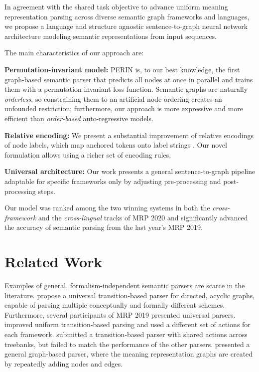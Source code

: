\documentclass[11pt,a4paper]{article}
\newenvironment{citemize}{\begin{list}{}{\topsep=\smallskipamount\itemsep=1pt\parsep=1pt\labelwidth=.5em}}{\end{list}}
\begin{document}
In agreement with the shared task objective to advance uniform meaning representation parsing across diverse semantic graph frameworks and languages, we propose a language and structure agnostic sentence-to-graph neural network architecture modeling semantic representations from input sequences.

The main characteristics of our approach are:

\begin{citemize}
  \item \textbf{Permutation-invariant model:} PERIN is, to our best
  knowledge, the first graph-based semantic parser that predicts all nodes at once in parallel and trains them with a permutation-invariant loss function. Semantic graphs are naturally \emph{orderless}, so constraining them to an artificial node ordering creates an unfounded restriction; furthermore, our approach is more expressive and more efficient than \emph{order-based} auto-regressive models.
  \item \textbf{Relative encoding:} We present a substantial improvement of relative encodings of node labels, which map anchored tokens onto label strings \cite{Str:Str:19}. Our novel formulation allows using a richer set of encoding rules.
  \item \textbf{Universal architecture:} Our work presents a general sentence-to-graph pipeline adaptable for specific frameworks only by adjusting pre-processing and post-processing steps.
\end{citemize}

\noindent
Our model was ranked among the two winning systems in both the \emph{cross-framework} and the \emph{cross-lingual} tracks of MRP 2020 and significantly advanced the accuracy of semantic parsing from the last year's MRP 2019.
 \section{Related Work}

Examples of general, formalism-independent semantic parsers are scarce in the literature. \citet{hershcovich2018multitask} propose a universal transition-based parser for directed, acyclic graphs, capable of parsing multiple conceptually and formally different schemes. Furthermore, several participants of MRP 2019 presented universal parsers. \citet{Che:Dou:Xu:19} improved uniform transition-based parsing and used a different set of actions for each framework. \citet{Lai:Lo:Leu:19} submitted a transition-based parser with shared actions across treebanks, but failed to match the performance of the other parsers. \citet{Str:Str:19} presented a general graph-based parser, where the meaning representation graphs are created by repeatedly adding nodes and edges.
\end{document}
